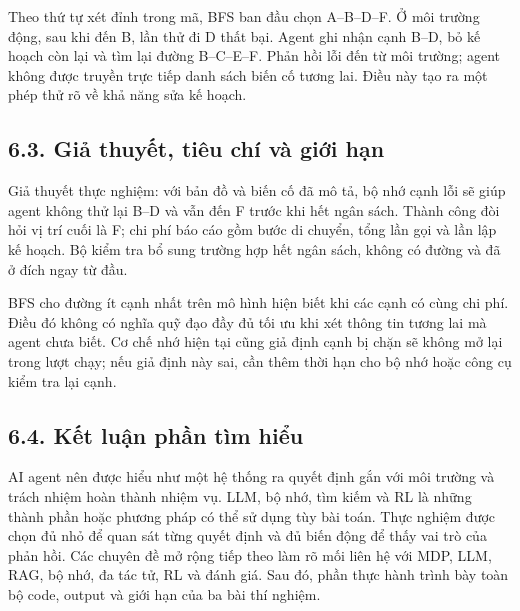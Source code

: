 \documentclass[11pt,a4paper]{article}
\begin{document}
\begin{center}
\end{center}

Theo thứ tự xét đỉnh trong mã, BFS ban đầu chọn A--B--D--F. Ở môi trường động, sau khi
đến B, lần thử đi D thất bại. Agent ghi nhận cạnh B--D, bỏ kế hoạch còn lại và tìm lại
đường B--C--E--F. Phản hồi lỗi đến từ môi trường; agent không được truyền trực tiếp
danh sách biến cố tương lai. Điều này tạo ra một phép thử rõ về khả năng sửa kế hoạch.

\subsection{6.3. Giả thuyết, tiêu chí và giới hạn}
Giả thuyết thực nghiệm: với bản đồ và biến cố đã mô tả, bộ nhớ cạnh lỗi sẽ giúp agent
không thử lại B--D và vẫn đến F trước khi hết ngân sách. Thành công đòi hỏi vị trí cuối
là F; chi phí báo cáo gồm bước di chuyển, tổng lần gọi và lần lập kế hoạch. Bộ kiểm tra
bổ sung trường hợp hết ngân sách, không có đường và đã ở đích ngay từ đầu.

BFS cho đường ít cạnh nhất trên mô hình hiện biết khi các cạnh có cùng chi phí.
Điều đó không có nghĩa quỹ đạo đầy đủ tối ưu khi xét thông tin tương lai mà agent chưa
biết. Cơ chế nhớ hiện tại cũng giả định cạnh bị chặn sẽ không mở lại trong lượt chạy;
nếu giả định này sai, cần thêm thời hạn cho bộ nhớ hoặc công cụ kiểm tra lại cạnh.

\subsection{6.4. Kết luận phần tìm hiểu}
AI agent nên được hiểu như một hệ thống ra quyết định gắn với môi trường và trách
nhiệm hoàn thành nhiệm vụ. LLM, bộ nhớ, tìm kiếm và RL là những thành phần hoặc phương
pháp có thể sử dụng tùy bài toán. Thực nghiệm được chọn đủ nhỏ để quan sát từng quyết
định và đủ biến động để thấy vai trò của phản hồi. Các chuyên đề mở rộng tiếp theo
làm rõ mối liên hệ với MDP, LLM, RAG, bộ nhớ, đa tác tử, RL và đánh giá. Sau đó, phần
thực hành trình bày toàn bộ code, output và giới hạn của ba bài thí nghiệm.
\end{document}
